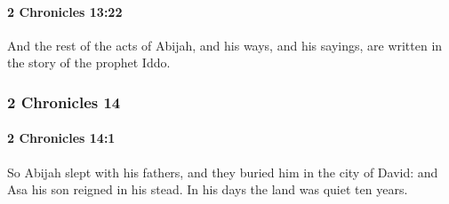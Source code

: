 		\paragraph{2 Chronicles 13:22} %
			\label{2CHRONICLES-13-22}

			And the rest of the acts of Abijah, and his ways, and his sayings, are written in the story of the prophet Iddo.

	\subsubsection{2 Chronicles 14} %
		\label{2CHRONICLES-14}

		\paragraph{2 Chronicles 14:1} %
			\label{2CHRONICLES-14-1}

			So Abijah slept with his fathers, and they buried him in the city of David: and Asa his son reigned in his stead. In his days the land was quiet ten years.


